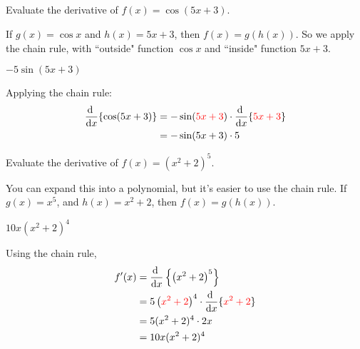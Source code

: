 \subsection*{\Procedural}



\begin{Mquestion}
Evaluate the derivative of $f(x)=\cos(5x+3)$.
\end{Mquestion}
\begin{hint}
If $g(x)=\cos x$ and $h(x)=5x+3$, then $f(x)=g(h(x))$. So we apply the chain rule, with ``outside" function $\cos x$ and ``inside" function $5x+3$.
\end{hint}
\begin{answer}
$-5\sin(5x+3)$
\end{answer}
\begin{solution}
Applying the chain rule:
\begin{align*}
\diff{}{x}\{\cos(5x+3)\}&=-\sin(\textcolor{red}{5x+3})\cdot\diff{}{x}\{\textcolor{red}{5x+3}\}\\
&=-\sin(5x+3)\cdot 5
\end{align*}
\end{solution}


\begin{question}
Evaluate the derivative of $f(x)=\left({x^2+2}\right)^5$.
\end{question}
\begin{hint}
You can expand this into a polynomial, but it's easier to use the chain rule. If $g(x)=x^5$, and $h(x)=x^2+2$, then $f(x)=g(h(x))$.
\end{hint}
\begin{answer}
$10x(x^2+2)^4$
\end{answer}
\begin{solution}
Using the chain rule,
\begin{align*}
f'(x)&=\diff{}{x}\left\{\left({x^2+2}\right)^5\right\}\\
&=5\left(\textcolor{red}{x^2+2}\right)^4\cdot\diff{}{x}\{\textcolor{red}{x^2+2}\}\\
&=5(x^2+2)^4 \cdot 2x\\
&=10x(x^2+2)^4
\end{align*}
\end{solution}


